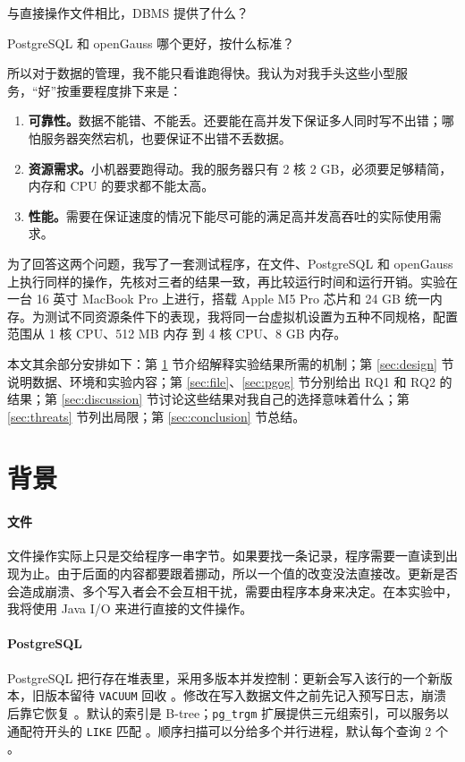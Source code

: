 \documentclass[UTF8,a4paper,zihao=5,fontset=none]{ctexart}
\newcommand{\code}[1]{\texttt{#1}}
\begin{document}
\begin{description}[leftmargin=3.4em,labelwidth=2.8em,labelsep=0.6em]
  \item[RQ1] 与直接操作文件相比，DBMS 提供了什么？
  \item[RQ2] PostgreSQL 和 openGauss 哪个更好，按什么标准？
\end{description}

所以对于数据的管理，我不能只看谁跑得快。我认为对我手头这些小型服务，“好”按重要程度排下来是：

\begin{enumerate}
  \item \textbf{可靠性。}数据不能错、不能丢。还要能在高并发下保证多人同时写不出错；哪怕服务器突然宕机，也要保证不出错不丢数据。
  \item \textbf{资源需求。}小机器要跑得动。我的服务器只有 2 核 2 GB，必须要足够精简，内存和 CPU 的要求都不能太高。
  \item \textbf{性能。}需要在保证速度的情况下能尽可能的满足高并发高吞吐的实际使用需求。
\end{enumerate}

为了回答这两个问题，我写了一套测试程序，在文件、PostgreSQL 和 openGauss 上执行同样的操作，先核对三者的结果一致，再比较运行时间和运行开销。实验在一台 16 英寸 MacBook Pro 上进行，搭载 Apple M5 Pro 芯片和 24 GB 统一内存。为测试不同资源条件下的表现，我将同一台虚拟机设置为五种不同规格，配置范围从 1 核 CPU、512 MB 内存 到 4 核 CPU、8 GB 内存。

本文其余部分安排如下：第 \ref{sec:background} 节介绍解释实验结果所需的机制；第 \ref{sec:design} 节说明数据、环境和实验内容；第 \ref{sec:file}、\ref{sec:pgog} 节分别给出 RQ1 和 RQ2 的结果；第 \ref{sec:discussion} 节讨论这些结果对我自己的选择意味着什么；第 \ref{sec:threats} 节列出局限；第 \ref{sec:conclusion} 节总结。

\section{背景}\label{sec:background}

\paragraph{文件}文件操作实际上只是交给程序一串字节。如果要找一条记录，程序需要一直读到出现为止。由于后面的内容都要跟着挪动，所以一个值的改变没法直接改。更新是否会造成崩溃、多个写入者会不会互相干扰，需要由程序本身来决定。在本实验中，我将使用 Java I/O 来进行直接的文件操作。

\paragraph{PostgreSQL}PostgreSQL 把行存在堆表里，采用多版本并发控制：更新会写入该行的一个新版本，旧版本留待 \code{VACUUM} 回收 \cite{pgmvcc}。修改在写入数据文件之前先记入预写日志，崩溃后靠它恢复 \cite{pgwal}。默认的索引是 B-tree；\code{pg\_trgm} 扩展提供三元组索引，可以服务以通配符开头的 \code{LIKE} 匹配 \cite{pgtrgm}。顺序扫描可以分给多个并行进程，默认每个查询 2 个 \cite{pgparallel}。
\end{document}
